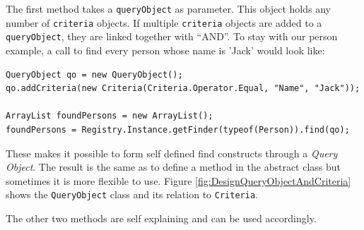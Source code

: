 			The first method takes a \verb~queryObject~ as parameter. This object holds any number
			of \verb~criteria~ objects. If multiple \verb~criteria~ objects are added to a \verb~queryObject~, they
			are linked together with ``AND''. To stay with our person example, a call to find
			every person whose name is 'Jack' would look like:
			
			\begin{Verbatim}
QueryObject qo = new QueryObject();
qo.addCriteria(new Criteria(Criteria.Operator.Equal, "Name", "Jack"));

ArrayList foundPersons = new ArrayList();
foundPersons = Registry.Instance.getFinder(typeof(Person)).find(qo);
			\end{Verbatim}
			
			These makes it possible to form self defined find constructs through a \textit{Query Object}.
			The result is the same as to define a method in the abstract class but sometimes it is  more
			flexible to use. Figure \ref{fig:DesignQueryObjectAndCriteria} shows the 
			\verb~QueryObject~ class and its relation to \verb~Criteria~.
			
			The other two methods are self explaining and can be used accordingly.
			

